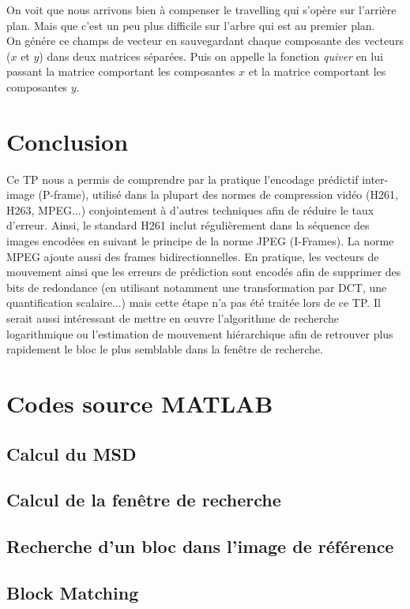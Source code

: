 \documentclass[a4paper, 12pt]{article}
\newcommand{\FSource}[1]{%

}
\begin{document}
On voit que nous arrivons bien à compenser le travelling qui s'opère sur l'arrière plan. Mais que c'est un peu plus difficile sur l'arbre qui est au premier plan.\\

On génére ce champs de vecteur en sauvegardant chaque composante des vecteurs ($x$ et $y$) dans deux matrices séparées. Puis on appelle la fonction \textit{quiver} en lui passant la matrice comportant les composantes $x$ et la matrice comportant les composantes $y$.



\newpage

\section{Conclusion}

Ce TP nous a permis de comprendre par la pratique l'encodage prédictif inter-image (P-frame), utilisé dans la plupart des normes de compression vidéo (H261, H263, MPEG...) conjointement à d'autres techniques afin de réduire le taux d'erreur. Ainsi, le standard H261 inclut régulièrement dans la séquence des images encodées en suivant le principe de la norme JPEG (I-Frames). La norme MPEG ajoute aussi des frames bidirectionnelles. 
En pratique, les vecteurs de mouvement ainsi que les erreurs de prédiction sont encodés afin de supprimer des bits de redondance (en utilisant notamment une transformation par DCT, une quantification scalaire...) mais cette étape n'a pas été traitée lors de ce TP.
Il serait aussi intéressant de mettre en œuvre l'algorithme de recherche logarithmique ou l'estimation de mouvement hiérarchique afin de retrouver plus rapidement le bloc le plus semblable dans la fenêtre de recherche.

\clearpage

%
%
\appendix

\section{Codes source MATLAB}

\subsection{Calcul du MSD}\label{msd_code}

\FSource{../compute_msd.m}

\newpage

\subsection{Calcul de la fenêtre de recherche}\label{search_window}

\FSource{../search_window.m}

\newpage

\subsection{Recherche d'un bloc dans l'image de référence}\label{block_search}

\FSource{../block_matching.m}

\newpage

\subsection{Block Matching}\label{block_matching}

\FSource{../block_matching_encode.m}
\end{document}
